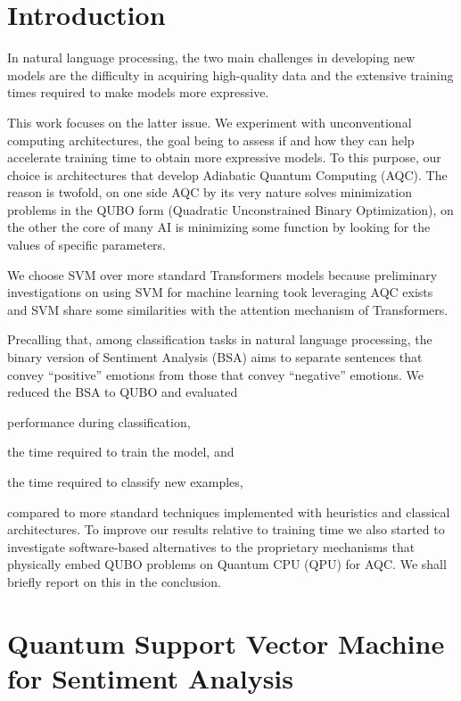 \documentclass{ceurart}
\begin{document}
\begin{spacing}{1}
\section{Introduction}
    In natural language processing, the two main challenges in developing new models are the difficulty in acquiring high-quality data and the extensive training times required to make models more expressive\cite{scaling}.

This work focuses on the latter issue. We experiment with unconventional computing architectures, the goal being to assess if and how they can help accelerate training time to obtain more expressive models. To this purpose, our choice is architectures that develop Adiabatic Quantum Computing (AQC). The reason is twofold, on one side AQC by its very nature solves minimization problems in the QUBO form (Quadratic Unconstrained Binary Optimization), on the other the core of many AI is minimizing some function by looking for the values of specific parameters.

We choose SVM\cite{SVM} over more standard Transformers models because preliminary investigations on using SVM for machine learning took leveraging AQC exists\cite{QSVM} and SVM share some similarities with the attention mechanism of Transformers\cite{TransformerSVM}.

Precalling that, among classification tasks in natural language processing, the binary version of Sentiment Analysis (BSA) aims to separate sentences that convey ``positive'' emotions from those that convey ``negative'' emotions. We reduced the BSA to QUBO and evaluated
\begin{enumerate*}
    \item performance during classification,
    \item the time required to train the model, and
    \item the time required to classify new examples,
\end{enumerate*}
compared to more standard techniques implemented with heuristics and classical architectures. To improve our results relative to training time we also started to investigate software-based alternatives to the proprietary mechanisms that physically embed QUBO problems on Quantum CPU (QPU) for AQC. We shall briefly report on this in the conclusion.

\section{Quantum Support Vector Machine for Sentiment Analysis}


\end{spacing}
\end{document}

